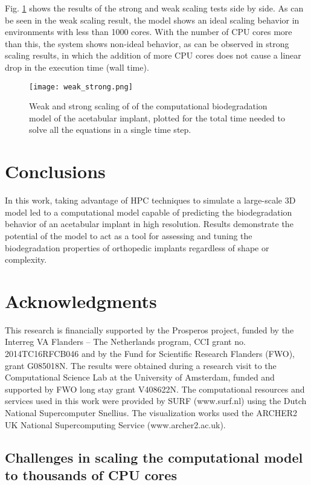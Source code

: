 Fig. \ref{fig:cup_weak_strong} shows the results of the strong and weak scaling tests side by side. As can be seen in the weak scaling result, the model shows an ideal scaling behavior in environments with less than \num{1000} cores. With the number of CPU cores more than this, the system shows non-ideal behavior, as can be observed in strong scaling results, in which the addition of more CPU cores does not cause a linear drop in the execution time (wall time).


\begin{figure}[h]
\centering
\medskip
\texttt{[image: weak\_strong.png]}
\caption[Weak and strong scaling of of the acetabular implant model]{Weak and strong scaling of of the computational biodegradation model of the acetabular implant, plotted for the total time needed to solve all the equations in a single time step.} \label{fig:cup_weak_strong}
\end{figure}

\section{Conclusions}

In this work, taking advantage of HPC techniques to simulate a large-scale 3D model led to a computational model capable of predicting the biodegradation behavior of an acetabular implant in high resolution. Results demonstrate the potential of the model to act as a tool for assessing and tuning the biodegradation properties of orthopedic  implants regardless of shape or complexity.

\section{Acknowledgments}

This research is financially supported by the Prosperos project, funded by the Interreg VA Flanders – The Netherlands program, CCI grant no. 2014TC16RFCB046 and by the Fund for Scientific Research Flanders (FWO), grant G085018N. The results were obtained during a research visit to the Computational Science Lab at the University of Amsterdam, funded and supported by FWO long stay grant V408622N. The computational resources and services used in this work were provided by SURF (www.surf.nl) using the Dutch National Supercomputer Snellius. The visualization works used the ARCHER2 UK National Supercomputing Service (www.archer2.ac.uk).


\begin{subappendices}

\section{Challenges in scaling the computational model to thousands of CPU cores}


\end{subappendices}


\cleardoublepage
